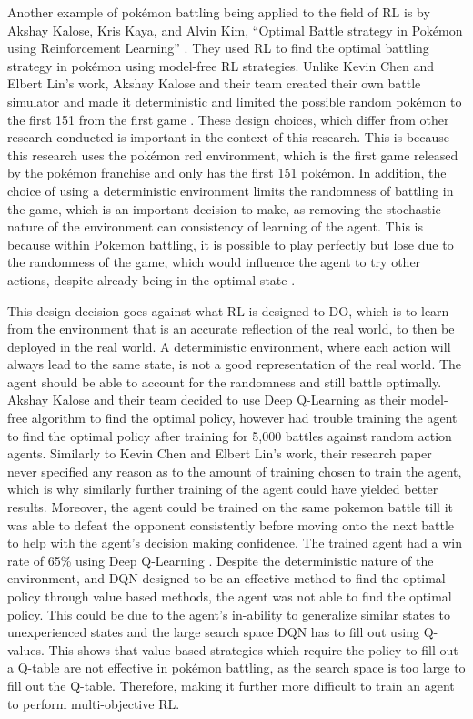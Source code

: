 Another example of pokémon battling being applied to the field of RL is by Akshay Kalose, Kris Kaya, and Alvin Kim, ``Optimal Battle strategy in Pokémon using Reinforcement Learning'' \cite{kalose2018optimal}. They used RL to find the optimal battling strategy in pokémon using model-free RL strategies. Unlike Kevin Chen and Elbert Lin's work, Akshay Kalose and their team created their own battle simulator and made it deterministic and limited the possible random pokémon to the first 151 from the first game \cite{kalose2018optimal}. These design choices, which differ from other research conducted is important in the context of this research. This is because this research uses the pokémon red environment, which is the first game released by the pokémon franchise and only has the first 151 pokémon. In addition, the choice of using a deterministic environment limits the randomness of battling in the game, which is an important decision to make, as removing the stochastic nature of the environment can consistency of learning of the agent. This is because within Pokemon battling, it is possible to play perfectly but lose due to the randomness of the game, which would influence the agent to try other actions, despite already being in the optimal state \cite{kalose2018optimal}. 

This design decision goes against what RL is designed to DO, which is to learn from the environment that is an accurate reflection of the real world, to then be deployed in the real world. A deterministic environment, where each action will always lead to the same state, is not a good representation of the real world. The agent should be able to account for the randomness and still battle optimally. Akshay Kalose and their team decided to use Deep Q-Learning as their model-free algorithm to find the optimal policy, however had trouble training the agent to find the optimal policy after training for 5,000 battles against random action agents. Similarly to Kevin Chen and Elbert Lin's work, their research paper never specified any reason as to the amount of training chosen to train the agent, which is why similarly further training of the agent could have yielded better results. Moreover, the agent could be trained on the same pokemon battle till it was able to defeat the opponent consistently before moving onto the next battle to help with the agent's decision making confidence. The trained agent had a win rate of 65\% using Deep Q-Learning \cite{kalose2018optimal}. Despite the deterministic nature of the environment, and DQN designed to be an effective method to find the optimal policy through value based methods, the agent was not able to find the optimal policy. This could be due to the agent's in-ability to generalize similar states to unexperienced states and the large search space DQN has to fill out using Q-values. This shows that value-based strategies which require the policy to fill out a Q-table are not effective in pokémon battling, as the search space is too large to fill out the Q-table. Therefore, making it further more difficult to train an agent to perform multi-objective RL.

